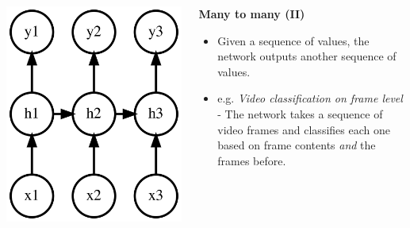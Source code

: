 \documentclass{beamer}
\begin{document}
\begin{frame}[allowframebreaks]
\begin{columns}
\begin{column}{0.3\textwidth}
      \includegraphics[height=0.5\textheight]{../img/many-to-many-2.png}
    \end{column}
    \begin{column}{0.7\textwidth}
      \begin{center}
        \textbf{Many to many (II)}
      \end{center}
      \begin{itemize}
        \item Given a sequence of values, the network outputs another sequence of values.
        \item e.g. \textit{Video classification on frame level} - The network takes a sequence of video frames and classifies each one based on frame contents \textit{and} the frames before.
      \end{itemize}
    \end{column}
  \end{columns}
\end{frame}
\end{document}
